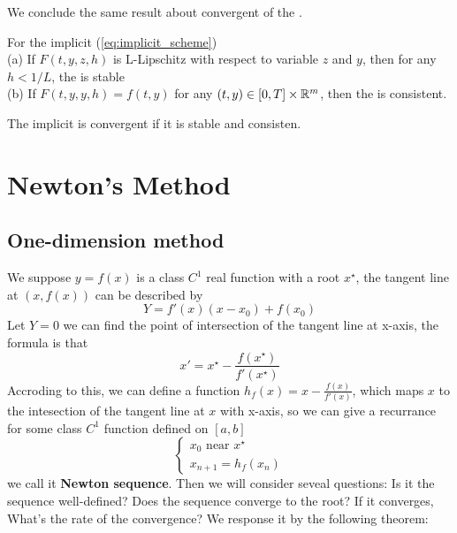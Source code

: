 \documentclass[en,hazy,black,pc,12pt]{elegantnote}
\begin{document}
We conclude the same result about convergent of the \sch.

\begin{proposition}
    For the implicit \sch (\ref{eq:implicit_scheme})
    \\(a) If \(F(t,y,z,h)\) is L-Lipschitz with respect to variable \(z\) and \(y\), then for any \(h< 1/L\), the \sch is stable
    \\(b) If \(F(t,y,y,h) = f(t,y)\) for any \((t,y) \in [0,T] \times \mathbb{R}^m\), then the \sch is consistent.
\end{proposition}

\begin{theorem} 
    The implicit \sch is convergent if it is stable and consisten.
\end{theorem}

\section{Newton's Method}
 
\subsection{One-dimension method}

We suppose \(y=f(x)\) is a class \(C^1\) real function with a root \(x^\star\), the tangent line at \((x,f(x))\) can be described by
\[ Y = f'(x)(x-x_0) + f(x_0)\]
Let \(Y=0\) we can find the point of intersection of the tangent line at x-axis, the formula is that 
\[x' = x^\star - \frac{f(x^\star)}{f'(x^\star)}\]
Accroding to this, we can define a function \(h_f(x) = x - \frac{f(x)}{f'(x)}\), which maps \(x\) to the intesection of the tangent line at \(x\) with x-axis, so we can give a recurrance for some class \(C^1\) function defined on \([a,b]\) 
\[\begin{cases}
  x_0 \text{ near } x^\star \\
  x_{n+1} = h_f(x_n)
\end{cases}\]
we call it \textbf{Newton sequence}. Then we will consider seveal questions: Is it the sequence well-defined? Does the sequence converge to the root? If it converges, What's the rate of the convergence? We response it by the following theorem:
\end{document}
